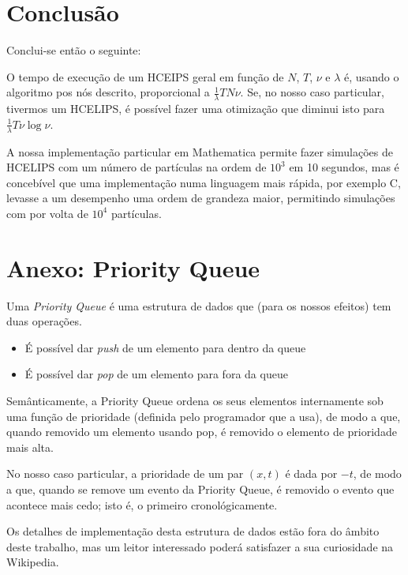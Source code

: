 \documentclass{article}
\begin{document}
	\section{Conclusão}
	
	Conclui-se então o seguinte:
	
	O tempo de execução de um HCEIPS geral em função de $N$, $T$, $\nu$ e $\lambda$ é, usando o algoritmo pos nós descrito, proporcional a $\frac 1 \lambda T N \nu$. Se, no nosso caso particular, tivermos um HCELIPS, é possível fazer uma otimização que diminui isto para $\frac 1 \lambda T \nu \log \nu$.
	
	A nossa implementação particular em Mathematica permite fazer simulações de HCELIPS com um número de partículas na ordem de $10^3$ em 10 segundos, mas é concebível que uma implementação numa linguagem mais rápida, por exemplo C, levasse a um desempenho uma ordem de grandeza maior, permitindo simulações com por volta de $10^4$ partículas.
	
	\section{Anexo: Priority Queue}
	
	Uma \emph{Priority Queue} é uma estrutura de dados que (para os nossos efeitos) tem duas operações.
	
	\begin{itemize}
	\item É possível dar \emph{push} de um elemento para dentro da queue
	
	\item É possível dar \emph{pop} de um elemento para fora da queue
	\end{itemize}
	
	Semânticamente, a Priority Queue ordena os seus elementos internamente sob uma função de prioridade (definida pelo programador que a usa), de modo a que, quando removido um elemento usando pop, é removido o elemento de prioridade mais alta.
	
	No nosso caso particular, a prioridade de um par $(x, t)$ é dada por $-t$, de modo a que, quando se remove um evento da Priority Queue, é removido o evento que acontece mais cedo; isto é, o primeiro cronológicamente.
	
	Os detalhes de implementação desta estrutura de dados estão fora do âmbito deste trabalho, mas um leitor interessado poderá satisfazer a sua curiosidade na Wikipedia.
\end{document}
